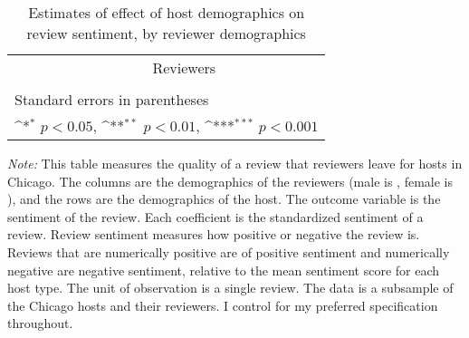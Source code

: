 \begin{landscape}
	\begin{table}[htbp]\centering
		\def\sym#1{\ifmmode^{#1}\else\(^{#1}\)\fi}
		\caption{Estimates of effect of host demographics on review sentiment, by reviewer demographics}
		\begin{tabular}{l *{8}{c}}
			\hline\hline
			&\multicolumn{8}{c}{Reviewers} \\
			\cmidrule(r){2-9}\\
				
			\hline\hline
			\multicolumn{9}{l}{\footnotesize Standard errors in parentheses}\\
			\multicolumn{9}{l}{\footnotesize \sym{*} \(p<0.05\), \sym{**} \(p<0.01\), \sym{***} \(p<0.001\)}\\
		\end{tabular}
	\label{table:sentiment}
	
		\begin{tablenotes}
			
			\item {\it Note:} This table measures the quality of a review that reviewers leave for hosts in Chicago. The columns are the demographics of the reviewers (male is , female is ), and the rows are the demographics of the host. The outcome variable is the sentiment of the review. Each coefficient is the standardized sentiment of a review. Review sentiment measures how positive or negative the review is. Reviews that are numerically positive are of positive sentiment and numerically negative are negative sentiment, relative to the mean sentiment score for each host type. The unit of observation is a single review. The data is a subsample of the Chicago hosts and their reviewers. I control for my preferred specification throughout. 
			
		\end{tablenotes}
		
	\end{table}
\end{landscape}



